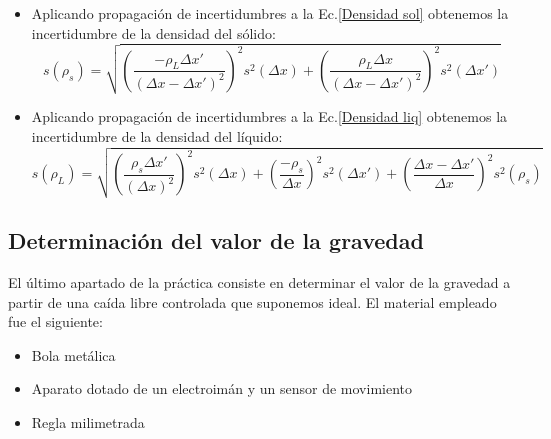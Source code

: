 \documentclass[a4paper,12pt,titlepage]{report}
\begin{document}
\begin{itemize}
    \item Aplicando propagación de incertidumbres a la Ec.\ref{Densidad sol} obtenemos la incertidumbre de la densidad del sólido:
    \begin{equation}
        s(\rho_s)=\sqrt{\left (\frac{-\rho_L \Delta x'}{(\Delta x -\Delta x')^2} \right )^2s^2(\Delta x) + \left (\frac{\rho_L \Delta x}{(\Delta x - \Delta x')^2}\right )^2s^2(\Delta x')}
        \label{Inc densidad solido}
    \end{equation}
    \item Aplicando propagación de incertidumbres a la Ec.\ref{Densidad liq} obtenemos la incertidumbre de la densidad del líquido:
    \begin{equation}
        s(\rho_L) = \sqrt{ \left (\frac{\rho_s\Delta x'}{(\Delta x)^2}\right )^2s^2(\Delta x) + \left (\frac{-\rho_s}{\Delta x} \right )^2s^2(\Delta x') + \left (\frac{\Delta x -\Delta x'}{\Delta x}\right )^2s^2(\rho_s)}
        \label{Inc densidad liquido}
    \end{equation}
\end{itemize}

\subsection{Determinación del valor de la gravedad}

El último apartado de la práctica consiste en determinar el valor de la gravedad a partir de una caída libre controlada que suponemos ideal. El material empleado fue el siguiente:

\begin{itemize}
    \item Bola metálica
    \item Aparato dotado de un electroimán y un sensor de movimiento
    \item Regla milimetrada
\end{itemize}
\end{document}
